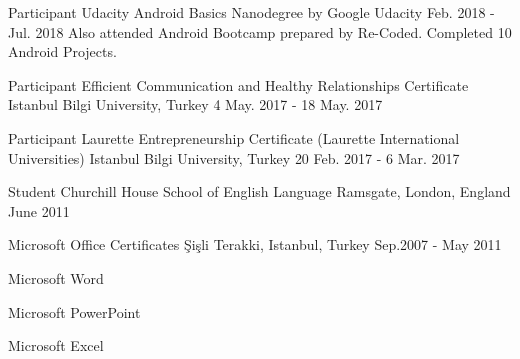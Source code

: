 


\begin{cventries}

\cventry
{Participant} %
{Udacity Android Basics Nanodegree by Google} %
{Udacity} %
{Feb. 2018 - Jul. 2018} %
{ Also attended Android Bootcamp prepared by Re-Coded. Completed 10 Android Projects.
}


\cventry
{Participant} %
{Efficient Communication and Healthy Relationships Certificate} %
{Istanbul Bilgi University, Turkey} %
{4 May. 2017 - 18 May. 2017} %
{ %
}


\cventry
{Participant} %
{Laurette Entrepreneurship Certificate (Laurette International Universities) } %
{Istanbul  Bilgi University, Turkey} %
{20 Feb. 2017 - 6 Mar. 2017} %
{ %
}


\cventry
{Student} %
{Churchill House School of English Language} %
{Ramsgate, London, England} %
{June 2011} %
{ %
}


\cventry
{} %
{Microsoft Office Certificates} %
{Şişli Terakki, Istanbul, Turkey} %
{Sep.2007 - May 2011} %
{ %
\begin{cvitems}
\item {Microsoft Word}
\item {Microsoft PowerPoint}
\item {Microsoft Excel}
\end{cvitems}
}


\end{cventries}